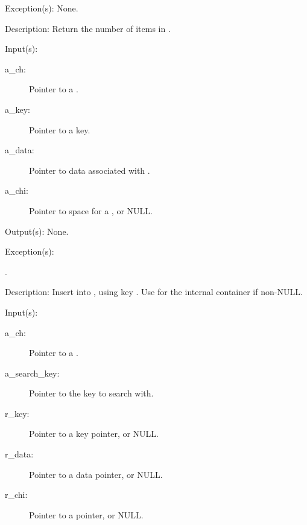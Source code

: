 \begin{capi}
\begin{capilist}
	\item[Exception(s): ] None.
	\item[Description: ]
		Return the number of items in .
	\end{capilist}
\label{ch_insert}
	\begin{capilist}
	\item[Input(s): ]
		\begin{description}\item[]
		\item[a\_ch: ]
			Pointer to a .
		\item[a\_key: ]
			Pointer to a key.
		\item[a\_data: ]
			Pointer to data associated with .
		\item[a\_chi: ]
			Pointer to space for a , or NULL.
		\end{description}
	\item[Output(s): ] None.
	\item[Exception(s): ]
		\begin{description}\item[]
		\item[.]
		\end{description}
	\item[Description: ]
		Insert  into , using key
		.  Use  for the internal
		 container if non-NULL.
	\end{capilist}
\label{ch_remove}
	\begin{capilist}
	\item[Input(s): ]
		\begin{description}\item[]
		\item[a\_ch: ]
			Pointer to a \classname{ch}.
		\item[a\_search\_key: ]
			Pointer to the key to search with.
		\item[r\_key: ]
			Pointer to a key pointer, or NULL.
		\item[r\_data: ]
			Pointer to a data pointer, or NULL.
		\item[r\_chi: ]
			Pointer to a  pointer, or NULL.

\end{description}
\end{capilist}
\end{capi}
